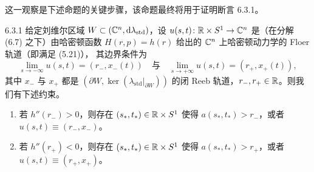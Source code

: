 
这一观察是下述命题的关键步骤，该命题最终将用于证明断言 6.3.1。

\begin{wprop}{6.3.1}
  给定刘维尔区域 $W\subset(\mathbb{C}^n,\mathrm{d}\lambda_{\mathrm{std}})$，设
  $u(s,t)\colon\mathbb{R}\times S^1\to\mathbb{C}^n$ 是（在分解 (6.7) 之下）由哈密顿函数
  $H(r,p)=h(r)$ 给出的 $\mathbb{C}^n$ 上哈密顿动力学的 Floer 轨道（即满足 (5.21)），
  其边界条件为
  \[
    \lim_{s\to-\infty}u(s,t)=(r_-,x_-(t))
    \quad\text{与}\quad
    \lim_{s\to+\infty}u(s,t)=(r_+,x_+(t)),
  \]
  其中 $x_-$ 与 $x_+$ 都是 $(\partial W,\ker(\lambda_{\mathrm{std}}|_{\partial W}))$
  的闭 Reeb 轨道，$r_-,r_+\in\mathbb{R}$。则我们有下述约束。
  \begin{enumerate}[label=(\roman*)]
    \item 若 $h''(r_-)>0$，则存在 $(s_\ast,t_\ast)\in\mathbb{R}\times S^1$ 使得
          $a(s_\ast,t_\ast)>r_-$，或者 $u(s,t)\equiv(r_-,x_-)$。
    \item 若 $h''(r_+)<0$，则存在 $(s_\ast,t_\ast)\in\mathbb{R}\times S^1$ 使得
          $a(s_\ast,t_\ast)>r_+$，或者 $u(s,t)\equiv(r_+,x_+)$。
  \end{enumerate}
\end{wprop}

